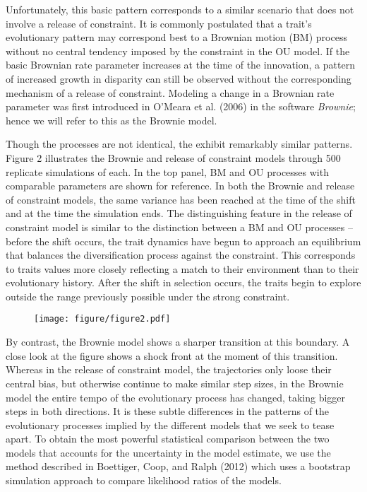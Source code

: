 \documentclass[author-year, review, 12pt]{elsarticle} %
\begin{document}
Unfortunately, this basic pattern corresponds to a similar scenario that
does not involve a release of constraint. It is commonly postulated that
a trait's evolutionary pattern may correspond best to a Brownian motion
(BM) process without no central tendency imposed by the constraint in
the OU model. If the basic Brownian rate parameter increases at the time
of the innovation, a pattern of increased growth in disparity can still
be observed without the corresponding mechanism of a release of
constraint. Modeling a change in a Brownian rate parameter was first
introduced in O'Meara et al. (2006) in the software \emph{Brownie};
hence we will refer to this as the Brownie model.

Though the processes are not identical, the exhibit remarkably similar
patterns. Figure 2 illustrates the Brownie and release of constraint
models through 500 replicate simulations of each. In the top panel, BM
and OU processes with comparable parameters are shown for reference. In
both the Brownie and release of constraint models, the same variance has
been reached at the time of the shift and at the time the simulation
ends. The distinguishing feature in the release of constraint model is
similar to the distinction between a BM and OU processes -- before the
shift occurs, the trait dynamics have begun to approach an equilibrium
that balances the diversification process against the constraint. This
corresponds to traits values more closely reflecting a match to their
environment than to their evolutionary history. After the shift in
selection occurs, the traits begin to explore outside the range
previously possible under the strong constraint.

\begin{figure}[htbp]
\centering
\texttt{[image: figure/figure2.pdf]}
\caption{}
\end{figure}

By contrast, the Brownie model shows a sharper transition at this
boundary. A close look at the figure shows a shock front at the moment
of this transition.\\Whereas in the release of constraint model, the
trajectories only loose their central bias, but otherwise continue to
make similar step sizes, in the Brownie model the entire tempo of the
evolutionary process has changed, taking bigger steps in both
directions. It is these subtle differences in the patterns of the
evolutionary processes implied by the different models that we seek to
tease apart. To obtain the most powerful statistical comparison between
the two models that accounts for the uncertainty in the model estimate,
we use the method described in Boettiger, Coop, and Ralph (2012) which
uses a bootstrap simulation approach to compare likelihood ratios of the
models.
\end{document}
